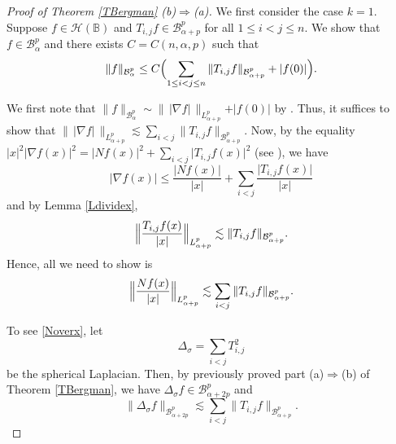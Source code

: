 \documentclass{amsart}
\theoremstyle{definition}
\theoremstyle{remark}
\begin{document}
\begin{proof}[Proof of Theorem \ref{TBergman} (b)$\Rightarrow$(a)]
We first consider the case $k=1$.
Suppose $f\in\mathcal H(\mathbb B)$ and
$T_{i,j}f\in\mathcal B^p_{\alpha+p}$ for all $1\le i<j\le n$.
We show that $f\in\mathcal B^p_\alpha$ and there exists $C=C(n,\alpha,p)$
such that
\begin{equation*}
\|f\|_{\mathcal B^p_\alpha}
\le C
\Bigl(\sum_{1\le i<j\le n} \|T_{i,j}f\|_{\mathcal B^p_{\alpha+p}}+\vert f(0)\vert\Bigr).
\end{equation*}

We first note that
$\|f\|_{\mathcal B^p_\alpha}
\sim\|\,\vert\nabla f\vert\,\|_{L^p_{\alpha+p}}+\vert f(0)\vert$
by \cite[Theorem 10.3.3]{St1}.
Thus, it suffices to show that
$\|\,\vert\nabla f\vert\,\|_{L^p_{\alpha+p}}
\lesssim\sum_{i<j} \|T_{i,j}f\|_{\mathcal B^p_{\alpha+p}}$.
Now, by the equality
$\vert x\vert^2\vert\nabla f(x)\vert^2
=\vert Nf(x)\vert^2+\sum_{i<j}\vert T_{i,j} f(x)\vert^2$
(see \cite[p.~56]{St1}), we have
\begin{equation*}
\vert \nabla f(x)\vert\le \frac{\vert Nf(x)\vert}{\vert x\vert}
+\sum_{i<j}\frac{\vert T_{i,j}f(x)\vert}{\vert x\vert}
\end{equation*}
and by Lemma \ref{Ldividex},
\begin{equation*}
\Bigl\|\frac{T_{i,j} f(x)}{\vert x\vert}\Bigr\|_{L^p_{\alpha+p}}
\lesssim \|T_{i,j}f\|_{\mathcal B^p_{\alpha+p}}.
\end{equation*}
Hence, all we need to show is
\begin{equation}\label{Noverx}
\Bigl\|\frac{N f(x)}{\vert x\vert}\Bigr\|_{L^p_{\alpha+p}}
\lesssim \sum_{i<j}\|T_{i,j}f\|_{\mathcal B^p_{\alpha+p}}.
\end{equation}

To see \eqref{Noverx}, let
\begin{equation*}
\Delta_\sigma=\sum_{i<j} T_{i,j}^2
\end{equation*}
be the spherical Laplacian.
Then, by previously proved part (a)$\Rightarrow$(b) of Theorem \ref{TBergman},
we have $\Delta_\sigma f\in\mathcal B^p_{\alpha+2p}$ and
\begin{equation}\label{Deltaf}
\|\Delta_\sigma f\|_{\mathcal B^p_{\alpha+2p}}
\lesssim \sum_{i<j} \|T_{i,j}f\|_{\mathcal B^p_{\alpha+p}}.
\end{equation}


\end{proof}
\end{document}
